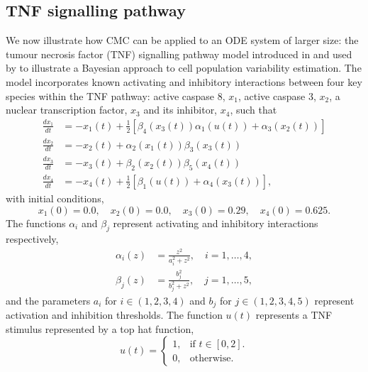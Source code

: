 \subsection{TNF signalling pathway}
We now illustrate how CMC can be applied to an ODE system of larger size: the tumour necrosis factor (TNF) signalling pathway model introduced in \cite{chaves2008bistable} and used by \cite{hasenauer2011identification} to illustrate a Bayesian approach to cell population variability estimation. The model incorporates known activating and inhibitory interactions between four key species within the TNF pathway: active caspase 8, $x_1$, active caspase 3, $x_2$, a nuclear transcription factor, $x_3$ and its inhibitor, $x_4$, such that
%
\begin{equation}\label{eq:tnf}
\begin{aligned}
\frac{dx_1}{dt} &= -x_1(t) + \frac{1}{2}\left[\beta_4(x_3(t))\alpha_1(u(t)) + \alpha_3(x_2(t))\right]\\
\frac{dx_2}{dt} &= -x_2(t) + \alpha_2(x_1(t)) \beta_3(x_3(t))\\
\frac{dx_3}{dt} &= -x_3(t) + \beta_2(x_2(t)) \beta_5(x_4(t))\\
\frac{dx_4}{dt} &= -x_4(t) + \frac{1}{2}\left[\beta_1(u(t)) + \alpha_4(x_3(t))\right],
\end{aligned}
\end{equation}
%
with initial conditions,
\begin{equation}
x_1(0)=0.0, \quad x_2(0)=0.0, \quad x_3(0)=0.29, \quad x_4(0)=0.625.
\end{equation}
The functions $\alpha_i$ and $\beta_j$ represent activating and inhibitory interactions respectively,
%
\begin{equation}
\begin{aligned}
\alpha_i(z) &= \frac{z^2}{a_i^2 + z^2}, \quad i=1, \dots, 4,\\
\beta_j(z)  &= \frac{b_j^2}{b_j^2 + z^2}, \quad j = 1, \dots, 5,
\end{aligned}
\end{equation}
%
and the parameters $a_i$ for $i\in(1,2,3,4)$ and $b_j$ for $j\in(1,2,3,4,5)$ represent activation and inhibition thresholds. The function $u(t)$ represents a TNF stimulus represented by a top hat function,
%
\begin{equation}
u(t)=\begin{cases}
1, & \text{if $t\in[0,2]$}.\\
0, & \text{otherwise}.
\end{cases}
\end{equation}
%

